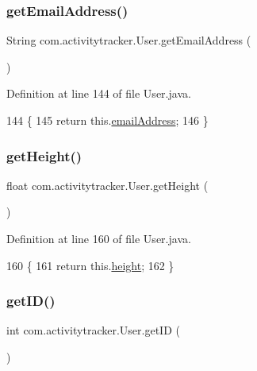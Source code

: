 \subsubsection{\texorpdfstring{get\+Email\+Address()}{getEmailAddress()}}
{\footnotesize\ttfamily String com.\+activitytracker.\+User.\+get\+Email\+Address (\begin{DoxyParamCaption}{ }\end{DoxyParamCaption})}



Definition at line 144 of file User.\+java.


\begin{DoxyCode}
144                                     \{
145         \textcolor{keywordflow}{return} this.\mbox{\hyperlink{classcom_1_1activitytracker_1_1_user_ac2fdb9a858d0295e52c5f8bc179e3137}{emailAddress}};
146     \}
\end{DoxyCode}
\mbox{\label{classcom_1_1activitytracker_1_1_user_a2a80ab659d02a07176b1793354131c00}} 
\subsubsection{\texorpdfstring{get\+Height()}{getHeight()}}
{\footnotesize\ttfamily float com.\+activitytracker.\+User.\+get\+Height (\begin{DoxyParamCaption}{ }\end{DoxyParamCaption})}



Definition at line 160 of file User.\+java.


\begin{DoxyCode}
160                              \{
161         \textcolor{keywordflow}{return} this.\mbox{\hyperlink{classcom_1_1activitytracker_1_1_user_a83cdfe6f520a4e18e8710e8e11f8c3d6}{height}};
162     \}
\end{DoxyCode}
\mbox{\label{classcom_1_1activitytracker_1_1_user_a967ae64a7818e9e532ad6d361650d8e6}} 
\subsubsection{\texorpdfstring{get\+I\+D()}{getID()}}
{\footnotesize\ttfamily int com.\+activitytracker.\+User.\+get\+ID (\begin{DoxyParamCaption}{ }\end{DoxyParamCaption})}



